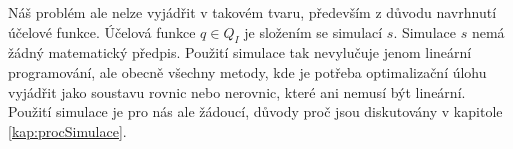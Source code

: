 Náš problém ale nelze vyjádřit v takovém tvaru, především z důvodu navrhnutí účelové funkce.
Účelová funkce $q \in Q_I$ je složením se simulací $s$. Simulace $s$ nemá žádný matematický předpis.
Použití simulace tak nevylučuje jenom lineární programování, ale obecně všechny metody, kde je potřeba optimalizační úlohu vyjádřit jako
soustavu rovnic nebo nerovnic, které ani nemusí být lineární.
Použití simulace je pro nás ale žádoucí, důvody proč jsou diskutovány v kapitole \ref{kap:procSimulace}.

